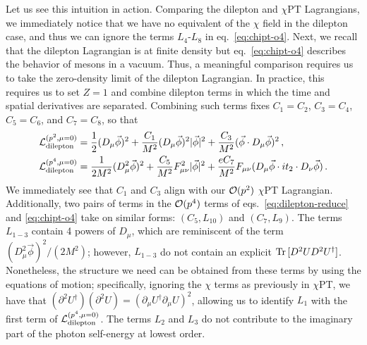 Let us see this intuition in action. Comparing the dilepton and $\chi$PT Lagrangians, we immediately notice that we have no equivalent of the $\chi$ field in the dilepton case, and thus we can ignore the terms $L_4$-$L_8$ in eq.~\eqref{eq:chipt-o4}. Next, we recall that the dilepton Lagrangian is at finite density but eq.~\eqref{eq:chipt-o4} describes the behavior of mesons in a vacuum. Thus, a meaningful comparison requires us to take the zero-density limit of the dilepton Lagrangian. In practice, this requires us to set $Z=1$ and combine dilepton terms in which the  time and spatial derivatives are separated. Combining such terms fixes $C_1 = C_2$, $C_3=C_4$, $C_5=C_6$, 
and $C_7=C_8$, 
so that
\begin{align}\label{eq:dilepton-reduce}
    &\mathcal{L}_{\rm dilepton}^{(p^2,\mu=0)} = \frac{1}{2} (D_\mu \vec{\phi})^2 +  
    \frac{C_1}{M^2} (D_\mu \vec\phi)^2 |\vec\phi|^2
    + \frac{C_3}{M^2} (\vec{\phi}\cdot D_\mu \vec\phi)^2  
    \,,
    \nonumber\\
    &\mathcal{L}_{\rm dilepton}^{(p^4,\mu=0)} = 
    \frac{1}{2 M^2} (D_\mu^2 \vec{\phi})^2 
    + \frac{C_5}{M^2}F_{\mu\nu}^2 |\vec\phi|^2 
    + \frac{e C_7}{M^2} F_{\mu\nu} (D_\mu\vec{\phi} \cdot
    i t_2 \cdot D_\nu \vec{\phi})\,.
\end{align}
We immediately see that $C_1$ and $C_3$ align with our $\mathcal{O}(p^2)$ $\chi$PT Lagrangian. Additionally, two pairs of terms in the $\mathcal{O}(p^4)$ terms of eqs.~\eqref{eq:dilepton-reduce} and \eqref{eq:chipt-o4} take on similar forms: $(C_5, L_{10})$ and $(C_7, L_9)$.
The terms $L_{1-3}$ contain 4 powers of $D_\mu$, which are reminiscent of the term $(D_\mu^2 \vec{\phi})^2/(2 M^2)$; however, $L_{1-3}$ do not contain an explicit $\text{Tr\,}[D^2U D^2 U^\dagger]$. Nonetheless, the structure we need can be obtained from these terms by using the equations of motion; specifically, ignoring the $\chi$ terms as previously in $\chi$PT, we have that $  (\partial^2U^\dagger)(\partial^2U)=(\partial_\mu U^\dagger \partial_\mu U)^2$, allowing us to identify $L_1$ with the first term of $\mathcal{L}_{\rm dilepton}^{(p^4,\mu=0)}$. The terms $L_2$ and $L_3$ do not contribute to the imaginary part of the photon self-energy at lowest order.